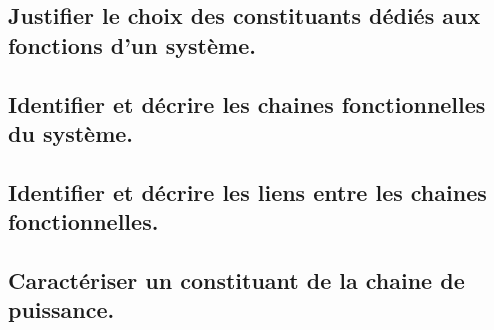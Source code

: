 \documentclass[10pt,fleqn]{book}
\newcommand{\repRel}{../..}
\newcommand{\repStyle}{\repRel/Style}
\newcommand{\td}{fichier_td}
\newcommand{\repExos}{\repRel/ExercicesCompetences}
\newcommand{\repExo}{dossier}
\begin{document}
\begin{multicols}{2} 

\renewcommand{\repExo}{\repExos/A3_AnalyseFonctionnelleStructurelle/A3_01_ChaineFonctionnelle/58_Oz440}
\renewcommand{\td}{58_Oz440}
\graphicspath{{\repStyle/png/}{\repExo/images/}}


\renewcommand{\repExo}{\repExos/A3_AnalyseFonctionnelleStructurelle/A3_01_ChaineFonctionnelle/59_Levage}
\renewcommand{\td}{59_Levage}
\graphicspath{{\repStyle/png/}{\repExo/images/}}


\renewcommand{\repExo}{\repExos/A3_AnalyseFonctionnelleStructurelle/A3_01_ChaineFonctionnelle/60_Escalier}
\renewcommand{\td}{60_Escalier}
\graphicspath{{\repStyle/png/}{\repExo/images/}}


\end{multicols}

\subsection{Justifier le choix des constituants dédiés aux fonctions d’un système.} 

\begin{multicols}{2} 

\end{multicols}

\subsection{Identifier et décrire les chaines fonctionnelles du système.} 

\begin{multicols}{2} 

\end{multicols}

\subsection{Identifier et décrire les liens entre les chaines fonctionnelles.} 

\begin{multicols}{2} 

\end{multicols}

\subsection{Caractériser un constituant de la chaine de puissance.} 
\end{document}
